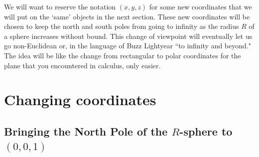 \documentclass{article}%
\begin{document}
We will want to reserve the notation $\left(  x,y,z\right)  $ for some new
coordinates that we will put on the `same' objects in the next section. These
new coordinates will be chosen to keep the north and south poles from going to
infinity as the radius $R$ of a sphere increases without bound. This change of
viewpoint will eventually let us go non-Euclidean or, in the language of Buzz
Lightyear \textquotedblleft to infinity and beyond." The idea will be like the
change from rectangular to polar coordinates for the plane that you
encountered in calculus, only easier. \newpage

\section{Changing coordinates}

\subsection{Bringing the North Pole of the $R$-sphere to $\left(
0,0,1\right)  $}
\end{document}
